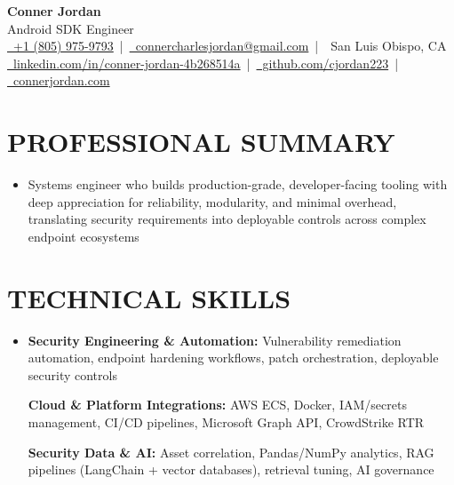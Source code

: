 \documentclass[letterpaper,10pt]{article}
\newcommand{\resumeSubHeadingListStart}{\begin{itemize}[leftmargin=0in,label={}]}
\newcommand{\resumeSubHeadingListEnd}{\end{itemize}}
\begin{document}
\begin{center}
  {\Huge \textbf{Conner Jordan}}\\[0pt]
  {\Large Android SDK Engineer}\\[0pt]
  \href{tel:+18059759793}{\faPhone\ +1 (805) 975-9793} \,|\, 
  \href{mailto:connercharlesjordan@gmail.com}{\faEnvelope\ connercharlesjordan@gmail.com} \,|\, 
  \faMapMarker\ San Luis Obispo, CA \\[-2pt]
  \href{https://www.linkedin.com/in/conner-jordan-4b268514a/}{\faLinkedin\ linkedin.com/in/conner-jordan-4b268514a}
  \,|\, \href{https://github.com/cjordan223}{\faGithub\ github.com/cjordan223}
  \,|\, \href{https://connerjordan.com/}{\faGlobe\ connerjordan.com}
\end{center}

\vspace{4pt}

\section{PROFESSIONAL SUMMARY}
\vspace{8pt}
\resumeSubHeadingListStart
\item {\small
Systems engineer who builds production-grade, developer-facing tooling with deep appreciation for reliability, modularity, and minimal overhead, translating security requirements into deployable controls across complex endpoint ecosystems}
\resumeSubHeadingListEnd
\vspace{6pt}

\section{TECHNICAL SKILLS}
\vspace{6pt}
\resumeSubHeadingListStart
\item {\small
\textbf{Security Engineering \& Automation:} Vulnerability remediation automation, endpoint hardening workflows, patch orchestration, deployable security controls

\vspace{3pt}
\textbf{Cloud \& Platform Integrations:} AWS ECS, Docker, IAM/secrets management, CI/CD pipelines, Microsoft Graph API, CrowdStrike RTR

\vspace{3pt}
\textbf{Security Data \& AI:} Asset correlation, Pandas/NumPy analytics, RAG pipelines (LangChain + vector databases), retrieval tuning, AI governance
}
\resumeSubHeadingListEnd
\vspace{6pt}
\end{document}
